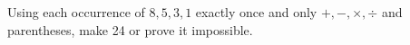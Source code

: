 Using each occurrence of $8,5,3,1$ exactly once and only $+,-,\times,\div$ and parentheses, make 24 or prove it impossible.
